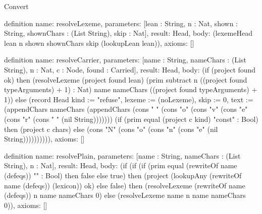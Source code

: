 \begin{lexlean}{Convert}
\begin{semanticmodule}
definition{
  name: resolveLexeme,
  parameters: [lean : String, n : Nat, shown : String, shownChars : (List String), skip : Nat],
  result: Head,
  body: (lexemeHead lean n shown shownChars skip (lookupLean lean)),
  axioms: []
}

definition{
  name: resolveCarrier,
  parameters: [name : String, nameChars : (List String), n : Nat, c : Node, found : Carried],
  result: Head,
  body: (if (project found ok) then (resolveLexeme (project found lean) (prim subtract n ((project found typeArguments) + 1) : Nat) name nameChars ((project found typeArguments) + 1)) else (record Head {kind := "refuse", lexeme := (noLexeme), skip := 0, text := (appendChars nameChars (appendChars (cons " " (cons "o" (cons "v" (cons "e" (cons "r" (cons " " (nil String))))))) (if (prim equal (project c kind) "const" : Bool) then (project c chars) else (cons "N" (cons "o" (cons "n" (cons "e" (nil String))))))))})),
  axioms: []
}

definition{
  name: resolvePlain,
  parameters: [name : String, nameChars : (List String), n : Nat],
  result: Head,
  body: (if (if (if (prim equal (rewriteOf name (defeqs)) "" : Bool) then false else true) then (project (lookupAny (rewriteOf name (defeqs)) (lexicon)) ok) else false) then (resolveLexeme (rewriteOf name (defeqs)) n name nameChars 0) else (resolveLexeme name n name nameChars 0)),
  axioms: []
}


\end{semanticmodule}
\end{lexlean}
